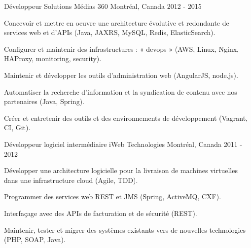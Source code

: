 \begin{cventries}
  \cventry
    {Développeur} %
    {Solutions Médias 360} %
    {Montréal, Canada} %
    {2012 - 2015} %
    {
      \begin{cvitems} %
        \item {Concevoir et mettre en oeuvre une architecture évolutive et redondante de services web et d’APIs (Java, JAXRS, MySQL, Redis, ElasticSearch).}
        \item {Configurer et maintenir des infrastructures : « devops » (AWS, Linux, Nginx, HAProxy, monitoring, security).}
        \item {Maintenir et développer les outils d’administration web (AngularJS, node.js).}
        \item {Automatiser la recherche d'information et la syndication de contenu avec nos partenaires (Java, Spring).}
        \item {Créer et entretenir des outils et des environnements de développement (Vagrant, CI, Git).}
      \end{cvitems}
    }

  \cventry
    {Développeur logiciel intermédiaire} %
    {iWeb Technologies} %
    {Montréal, Canada} %
    {2011 - 2012} %
    {
      \begin{cvitems} %
        \item {Développer une architecture logicielle pour la livraison de machines virtuelles dans une infrastructure cloud (Agile, TDD).}
        \item {Programmer des services web REST et JMS (Spring, ActiveMQ, CXF).}
        \item {Interfaçage avec des APIs de facturation et de sécurité (REST).}
        \item {Maintenir, tester et migrer des systèmes existants vers de nouvelles technologies (PHP, SOAP, Java).}
      \end{cvitems}
    }



\end{cventries}
